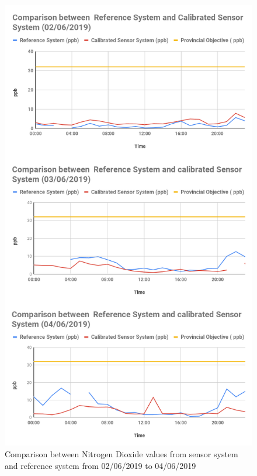 \begin{figure}[h]
  \begin{center}
  \includegraphics[scale=0.45]{images/figure107.png}
  \end{center}
  \caption{Comparison between Nitrogen Dioxide values from sensor system and reference system from 02/06/2019 to 04/06/2019}
  \label{Nitrogen1}

\end{figure}
\clearpage






